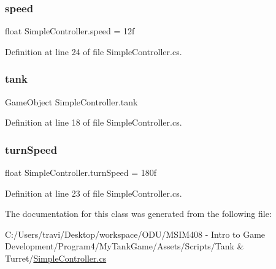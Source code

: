 \subsubsection{\texorpdfstring{speed}{speed}}
{\footnotesize\ttfamily float Simple\+Controller.\+speed = 12f}



Definition at line 24 of file Simple\+Controller.\+cs.

\mbox{\label{class_simple_controller_a36ea93e471504da2007474dd9cb9c824}} 
\subsubsection{\texorpdfstring{tank}{tank}}
{\footnotesize\ttfamily Game\+Object Simple\+Controller.\+tank}



Definition at line 18 of file Simple\+Controller.\+cs.

\mbox{\label{class_simple_controller_a481c0a24a21c34c2190ca128b4d87cfd}} 
\subsubsection{\texorpdfstring{turn\+Speed}{turnSpeed}}
{\footnotesize\ttfamily float Simple\+Controller.\+turn\+Speed = 180f}



Definition at line 23 of file Simple\+Controller.\+cs.



The documentation for this class was generated from the following file\+:\begin{DoxyCompactItemize}
\item 
C\+:/\+Users/travi/\+Desktop/workspace/\+O\+D\+U/\+M\+S\+I\+M408 -\/ Intro to Game Development/\+Program4/\+My\+Tank\+Game/\+Assets/\+Scripts/\+Tank \& Turret/\hyperlink{_simple_controller_8cs}{Simple\+Controller.\+cs}\end{DoxyCompactItemize}
